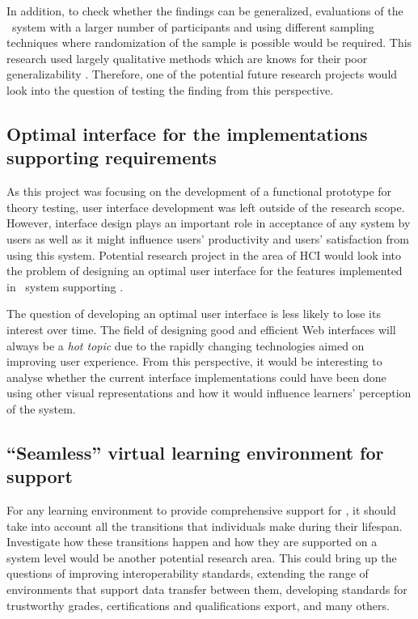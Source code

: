In addition, to check whether the findings can be generalized, evaluations of
the \ep~system with a larger number of participants and using different sampling
techniques where randomization of the sample is possible would be required. This
research used largely qualitative methods which are knows for their poor
generalizability \citep{Trochim2001}. Therefore, one of the potential future
research projects would look into the question of testing the finding from this
perspective.

\subsection[Optimal interface design]{Optimal interface for the implementations
supporting \LLLs requirements} 

As this project was focusing on the development of a functional prototype for
theory testing, user interface development was left outside of the research
scope. However, interface design plays an important role in acceptance of any
system by users as well as it might influence users' productivity and users'
satisfaction from using this system. Potential research project in the area of
HCI would look into the problem of designing an optimal user interface for the
features implemented in \ep~system supporting \LLLsn. 

The question of developing an optimal user interface is less likely to lose its
interest over time. The field of designing good and efficient Web interfaces
will always be a \textit{hot topic} due to the rapidly changing technologies
aimed on improving user experience. From this perspective, it would be
interesting to analyse whether the current interface implementations could have
been done using other visual representations and how it would influence
learners' perception of the system.

\subsection{``Seamless'' virtual learning environment for \LLLs support} 
For any learning environment to provide comprehensive support for \LLLs, it
should take into account all the transitions that individuals make during their
lifespan. Investigate how these transitions happen and how they are supported on
a system level would be another potential research area. This could bring up the
questions of improving interoperability standards, extending the range of
environments that support data transfer between them, developing standards for
trustworthy grades, certifications and qualifications export, and many others.

